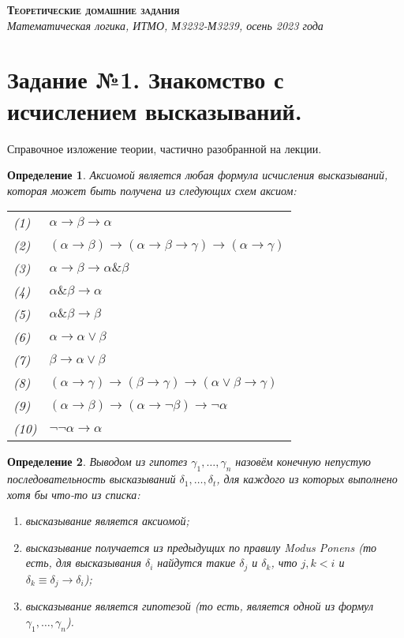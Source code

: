 \documentclass[10pt,a4paper,oneside]{article}
\newtheorem{definition}{Определение}
\begin{document}
\begin{center}{\Large\textsc{\textbf{Теоретические домашние задания}}}\\
             \it Математическая логика, ИТМО, М3232-М3239, осень 2023 года\end{center}

\section*{Задание №1. Знакомство с исчислением высказываний.}

Справочное изложение теории, частично разобранной на лекции.

\begin{definition}
Аксиомой является любая формула исчисления высказываний, которая может быть получена из следующих схем аксиом:

\begin{tabular}{ll}
(1) & $\alpha \rightarrow \beta \rightarrow \alpha$ \\
(2) & $(\alpha \rightarrow \beta) \rightarrow (\alpha \rightarrow \beta \rightarrow \gamma) \rightarrow (\alpha \rightarrow \gamma)$ \\
(3) & $\alpha \rightarrow \beta \rightarrow \alpha \& \beta$\\
(4) & $\alpha \& \beta \rightarrow \alpha$\\
(5) & $\alpha \& \beta \rightarrow \beta$\\
(6) & $\alpha \rightarrow \alpha \vee \beta$\\
(7) & $\beta \rightarrow \alpha \vee \beta$\\
(8) & $(\alpha \rightarrow \gamma) \rightarrow (\beta \rightarrow \gamma) \rightarrow (\alpha \vee \beta \rightarrow \gamma)$\\
(9) & $(\alpha \rightarrow \beta) \rightarrow (\alpha \rightarrow \neg \beta) \rightarrow \neg \alpha$\\
(10) & $\neg \neg \alpha \rightarrow \alpha$
\end{tabular}
\end{definition}

\begin{definition}
Выводом из гипотез $\gamma_1,\dots,\gamma_n$ назовём конечную непустую последовательность высказываний $\delta_1, \dots, \delta_t$, для каждого из которых
выполнено хотя бы что-то из списка:
\begin{enumerate}
\item высказывание является аксиомой;
\item высказывание получается из предыдущих по правилу Modus Ponens (то есть, для высказывания $\delta_i$ найдутся
такие $\delta_j$ и $\delta_k$, что $j,k < i$ и $\delta_k \equiv \delta_j \rightarrow \delta_i$);
\item высказывание является гипотезой (то есть, является одной из формул $\gamma_1,\dots,\gamma_n$).
\end{enumerate}
\end{definition}
\end{document}
